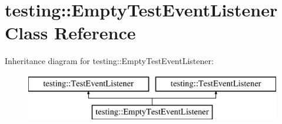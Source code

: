 \hypertarget{classtesting_1_1_empty_test_event_listener}{}\section{testing\+:\+:Empty\+Test\+Event\+Listener Class Reference}
\label{classtesting_1_1_empty_test_event_listener}
Inheritance diagram for testing\+:\+:Empty\+Test\+Event\+Listener\+:\begin{figure}[H]
\begin{center}
\leavevmode
\includegraphics[height=2.000000cm]{classtesting_1_1_empty_test_event_listener}
\end{center}
\end{figure}

